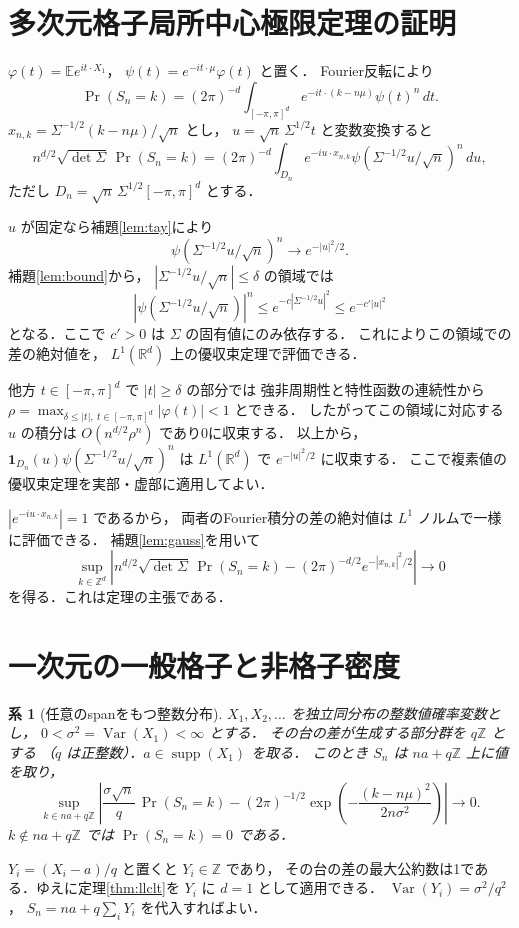 \documentclass[a5paper,10pt,onecolumn]{jsarticle}
\makeatletter
\theoremstyle{mathnotetheorem}
\newtheorem{corollary}[theorem]{系}
\renewcommand{\proofname}{証明}
\renewenvironment{proof}[1][\proofname]{%
  \par\pushQED{\qed}\normalfont\topsep4\p@\@plus2\p@\relax
  \trivlist\item[\hskip\labelsep\bfseries #1]\ignorespaces
}{\popQED\endtrivlist\@endpefalse}
\makeatother
\begin{document}
\section{多次元格子局所中心極限定理の証明}
\begin{proof}[定理\ref{thm:llclt}の証明]
$\varphi(t)=\mathbb Ee^{it\cdot X_1}$，
$\psi(t)=e^{-it\cdot\mu}\varphi(t)$ と置く．
Fourier反転により
\[
 \Pr(S_n=k)=(2\pi)^{-d}\int_{[-\pi,\pi]^d}
  e^{-it\cdot(k-n\mu)}\psi(t)^n\,dt.
\]
$x_{n,k}=\Sigma^{-1/2}(k-n\mu)/\sqrt n$ とし，
$u=\sqrt n\,\Sigma^{1/2}t$ と変数変換すると
\[
 n^{d/2}\sqrt{\det\Sigma}\,\Pr(S_n=k)
 =(2\pi)^{-d}\int_{D_n}
 e^{-iu\cdot x_{n,k}}\psi(\Sigma^{-1/2}u/\sqrt n)^n\,du,
\]
ただし $D_n=\sqrt n\,\Sigma^{1/2}[-\pi,\pi]^d$ とする．

$u$ が固定なら補題\ref{lem:tay}により
\[
 \psi(\Sigma^{-1/2}u/\sqrt n)^n
 \longrightarrow e^{-|u|^2/2}.
\]
補題\ref{lem:bound}から，
$|\Sigma^{-1/2}u/\sqrt n|\le\delta$ の領域では
\[
 |\psi(\Sigma^{-1/2}u/\sqrt n)|^n\le
  e^{-c|\Sigma^{-1/2}u|^2}\le e^{-c'|u|^2}
\]
となる．ここで $c'>0$ は $\Sigma$ の固有値にのみ依存する．
これによりこの領域での差の絶対値を，
$L^1(\mathbb R^d)$ 上の優収束定理で評価できる．

他方 $t\in[-\pi,\pi]^d$ で $|t|\ge\delta$ の部分では
強非周期性と特性函数の連続性から
$\rho=\max_{\delta\le|t|,\ t\in[-\pi,\pi]^d}|\varphi(t)|<1$ とできる．
したがってこの領域に対応する $u$ の積分は
$O(n^{d/2}\rho^n)$ であり0に収束する．
以上から，$\mathbf1_{D_n}(u)\psi(\Sigma^{-1/2}u/\sqrt n)^n$
は $L^1(\mathbb R^d)$ で $e^{-|u|^2/2}$ に収束する．
ここで複素値の優収束定理を実部・虚部に適用してよい．

$|e^{-iu\cdot x_{n,k}}|=1$ であるから，
両者のFourier積分の差の絶対値は
$L^1$ ノルムで一様に評価できる．
補題\ref{lem:gauss}を用いて
\[
 \sup_{k\in\mathbb Z^d}
 \left|n^{d/2}\sqrt{\det\Sigma}\,\Pr(S_n=k)
        -(2\pi)^{-d/2}e^{-|x_{n,k}|^2/2}\right|\to0
\]
を得る．これは定理の主張である．
\end{proof}

\section{一次元の一般格子と非格子密度}
\begin{corollary}[任意のspanをもつ整数分布]\label{cor:span}
$X_1,X_2,\ldots$ を独立同分布の整数値確率変数とし，
$0<\sigma^2=\operatorname{Var}(X_1)<\infty$ とする．
その台の差が生成する部分群を $q\mathbb Z$ とする
（$q$ は正整数）．$a\in\operatorname{supp}(X_1)$ を取る．
このとき $S_n$ は $na+q\mathbb Z$ 上に値を取り，
\[
 \sup_{k\in na+q\mathbb Z}\left|
   \frac{\sigma\sqrt n}{q}\,\Pr(S_n=k)
   -(2\pi)^{-1/2}
    \exp\!\left(-\frac{(k-n\mu)^2}{2n\sigma^2}\right)
 \right|\longrightarrow0.
\]
$k\notin na+q\mathbb Z$ では $\Pr(S_n=k)=0$ である．
\end{corollary}
\begin{proof}
$Y_i=(X_i-a)/q$ と置くと $Y_i\in\mathbb Z$ であり，
その台の差の最大公約数は1である．ゆえに定理\ref{thm:llclt}を
$Y_i$ に $d=1$ として適用できる．
$\operatorname{Var}(Y_i)=\sigma^2/q^2$，
$S_n=na+q\sum_iY_i$ を代入すればよい．
\end{proof}
\end{document}
